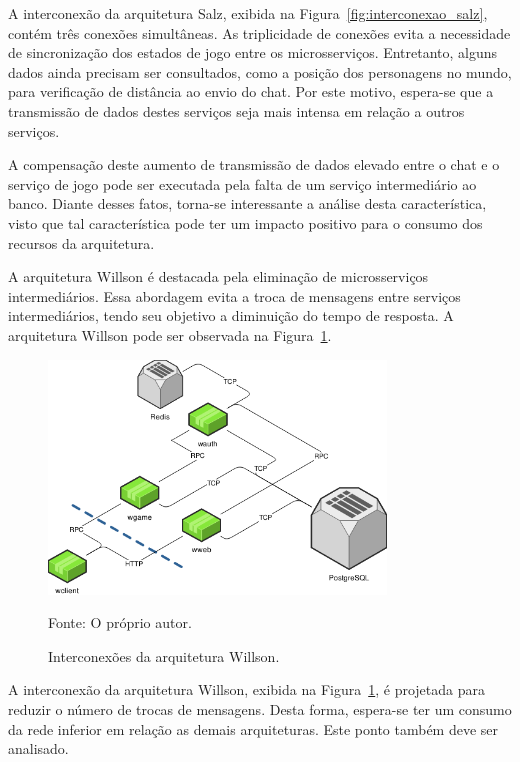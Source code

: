 A interconexão da arquitetura Salz, exibida na Figura~\ref{fig:interconexao_salz}, contém três conexões simultâneas.
%
As triplicidade de conexões evita a necessidade de sincronização dos estados de jogo entre os microsserviços.
%
Entretanto, alguns dados ainda precisam ser consultados, como a posição dos personagens no mundo, para verificação de distância ao envio do chat.
%
Por este motivo, espera-se que a transmissão de dados destes serviços seja mais intensa em relação a outros serviços.



A compensação deste aumento de transmissão de dados elevado entre o chat e o serviço de jogo pode ser executada pela falta de um serviço intermediário ao banco.
%
Diante desses fatos, torna-se interessante a análise desta característica, visto que tal característica pode ter um impacto positivo para o consumo dos recursos da arquitetura.



A arquitetura Willson é destacada pela eliminação de microsserviços intermediários.
%
Essa abordagem evita a troca de mensagens entre serviços intermediários, tendo seu objetivo a diminuição do tempo de resposta.
%
A arquitetura Willson pode ser observada na Figura~\ref{fig:interconexao_willson}.



\begin{figure}[htb!]
  \caption{Interconexões da arquitetura Willson.}
  \label{fig:interconexao_willson}
  \includegraphics[width=0.8\textwidth]{figuras/interconexoes/willson.png}
  \centering

  Fonte: O próprio autor.
\end{figure}



A interconexão da arquitetura Willson, exibida na Figura~\ref{fig:interconexao_willson}, é projetada para reduzir o número de trocas de mensagens.
%
Desta forma, espera-se ter um consumo da rede inferior em relação as demais arquiteturas. Este ponto também deve ser analisado.
